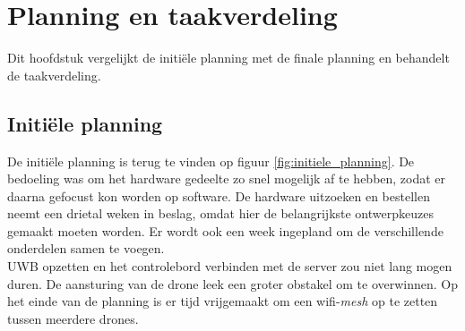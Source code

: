 \chapter{Planning en taakverdeling}
Dit hoofdstuk vergelijkt de initiële planning met de finale planning en behandelt de taakverdeling.

\section{Initi\"ele planning} \label{sec:initiele_planning}
De initi\"ele planning is terug te vinden op figuur \ref{fig:initiele_planning}.
De bedoeling was om het hardware gedeelte zo snel mogelijk af te hebben, zodat er daarna gefocust kon worden op software.
De hardware uitzoeken en bestellen neemt een drietal weken in beslag, omdat hier de belangrijkste ontwerpkeuzes gemaakt moeten worden.
Er wordt ook een week ingepland om de verschillende onderdelen samen te voegen.\\

UWB opzetten en het controlebord verbinden met de server zou niet lang mogen duren. 
De aansturing van de drone leek een groter obstakel om te overwinnen.
Op het einde van de planning is er tijd vrijgemaakt om een wifi-\textit{mesh} op te zetten tussen meerdere drones.\\

